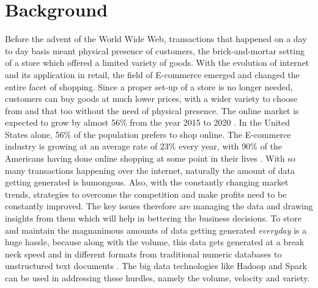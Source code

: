 \section{Background}
Before the advent of the World Wide Web, transactions that happened on a day to day basis meant physical presence of customers, the brick-and-mortar setting of a store which offered a limited variety of goods. With the evolution of internet and its application in retail, the field of E-commerce emerged and changed the entire facet of shopping. Since a proper set-up of a store is no longer needed, customers can buy goods at much lower prices, with a wider variety to choose from and that too without the need of physical presence. The online market is expected to grow by almost 56\% from the year 2015 to 2020 \cite{link2}. In the United States alone, 56\% of the population prefers to shop online. The E-commerce industry is growing at an average rate of 23\% every year, with 90\% of the Americans having done online shopping at some point in their lives \cite{link3}. With so many transactions happening over the internet, naturally the amount of data getting generated is humongous. Also, with the constantly changing market trends, strategies to overcome the competition and make profits need to be constantly improved. The key issues therefore are managing the data and drawing insights from them which will help in bettering the business decisions. To store and maintain the magnanimous amounts of data getting generated \emph{everyday} is a huge hassle, because along with the volume, this data gets generated at a break neck speed and in different formats from traditional numeric databases to unstructured text documents   \cite{link4}. The big data technologies like Hadoop and Spark can be used in addressing these hurdles, namely the volume, velocity and variety.

